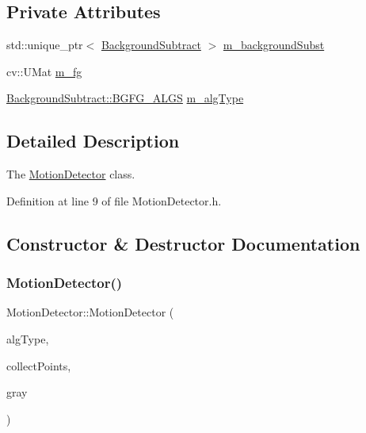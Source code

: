 \subsection*{Private Attributes}
\begin{DoxyCompactItemize}
\item 
std\+::unique\+\_\+ptr$<$ \mbox{\hyperlink{class_background_subtract}{Background\+Subtract}} $>$ \mbox{\hyperlink{class_motion_detector_ab0f8334cbe63bfaae0ed54650336e0d4}{m\+\_\+background\+Subst}}
\item 
cv\+::\+U\+Mat \mbox{\hyperlink{class_motion_detector_ac751815be986935ac095aff5428b6c24}{m\+\_\+fg}}
\item 
\mbox{\hyperlink{class_background_subtract_a56850081696df68b55f87b4f3d87949f}{Background\+Subtract\+::\+B\+G\+F\+G\+\_\+\+A\+L\+GS}} \mbox{\hyperlink{class_motion_detector_a5254c16cea9d7a7155a35fd92c0b12ac}{m\+\_\+alg\+Type}}
\end{DoxyCompactItemize}


\subsection{Detailed Description}
The \mbox{\hyperlink{class_motion_detector}{Motion\+Detector}} class. 

Definition at line 9 of file Motion\+Detector.\+h.



\subsection{Constructor \& Destructor Documentation}
\mbox{\label{class_motion_detector_a0df27eabc4f6d1cb55dc610dafa6a31f}} 
\subsubsection{\texorpdfstring{Motion\+Detector()}{MotionDetector()}}
{\footnotesize\ttfamily Motion\+Detector\+::\+Motion\+Detector (\begin{DoxyParamCaption}\item[{\mbox{\hyperlink{class_background_subtract_a56850081696df68b55f87b4f3d87949f}{Background\+Subtract\+::\+B\+G\+F\+G\+\_\+\+A\+L\+GS}}}]{alg\+Type,  }\item[{bool}]{collect\+Points,  }\item[{cv\+::\+U\+Mat \&}]{gray }\end{DoxyParamCaption})}



